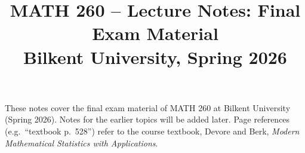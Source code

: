 \documentclass[11pt,a4paper]{article}
\title{MATH 260 -- Lecture Notes: Final Exam Material\\
\large Bilkent University, Spring 2026}
\date{}
\begin{document}
\maketitle

These notes cover the final exam material of MATH 260 at Bilkent University
(Spring 2026). Notes for the earlier topics will be added later. Page references (e.g.\ ``textbook p.~528'') refer to the
course textbook, Devore and Berk,
\emph{Modern Mathematical Statistics with Applications}.

\tableofcontents






\end{document}
